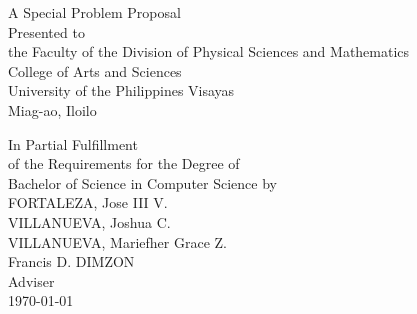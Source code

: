 \begin{titlepage}
\centering


\vspace{1.75cm}
A Special Problem Proposal\\
Presented to\\
the Faculty of the Division of Physical Sciences and Mathematics\\
College of Arts and Sciences\\
University of the Philippines Visayas\\
Miag-ao, Iloilo

\vspace{1.75cm}
In Partial Fulfillment\\
of the Requirements for the Degree of\\
Bachelor of Science in Computer Science
\vspace{1.75cm}
by\\

\vspace{1cm}
FORTALEZA, Jose III V. \\
VILLANUEVA, Joshua C.  \\
VILLANUEVA, Mariefher Grace Z.  \\

\vspace{1cm}
Francis D. DIMZON \\
Adviser\\

\vspace{1.75cm}
\today
\end{titlepage}